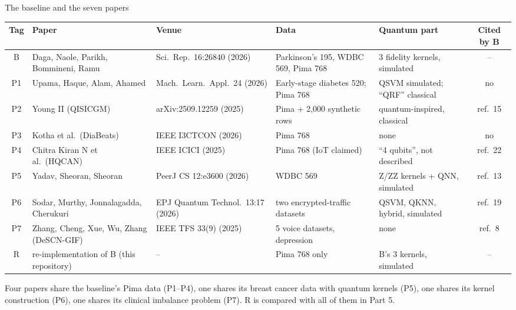 \documentclass[aspectratio=169,10pt,t,xcolor={table}]{beamer}
\begin{document}
\begin{frame}{The baseline and the seven papers}
\centering\scriptsize
\begin{tabularx}{\textwidth}{c L{3.7cm} L{3.0cm} Y L{2.7cm} c}
\toprule
Tag & Paper & Venue & Data & Quantum part & Cited by B \\
\midrule
B & Daga, Naole, Parikh, Bommineni, Ramu & Sci.\ Rep.\ 16:26840 (2026) & Parkinson's 195, WDBC 569, Pima 768 & 3 fidelity kernels, simulated & -- \\
P1 & Upama, Haque, Alam, Ahamed & Mach.\ Learn.\ Appl.\ 24 (2026) & Early-stage diabetes 520; Pima 768 & QSVM simulated; ``QRF'' classical & no \\
P2 & Young II (QISICGM) & arXiv:2509.12259 (2025) & Pima + 2,000 synthetic rows & quantum-inspired, classical & ref.\ 15 \\
P3 & Kotha et al.\ (DiaBeats) & IEEE I3CTCON (2026) & Pima 768 & none & no \\
P4 & Chitra Kiran N et al.\ (HQCAN) & IEEE ICICI (2025) & Pima 768 (IoT claimed) & ``4 qubits'', not described & ref.\ 22 \\
P5 & Yadav, Sheoran, Sheoran & PeerJ CS 12:e3600 (2026) & WDBC 569 & Z/ZZ kernels + QNN, simulated & ref.\ 13 \\
P6 & Sodar, Murthy, Jonnalagadda, Cherukuri & EPJ Quantum Technol.\ 13:17 (2026) & two encrypted-traffic datasets & QSVM, QKNN, hybrid, simulated & ref.\ 19 \\
P7 & Zhang, Cheng, Xue, Wu, Zhang (DeSCN-GIF) & IEEE TFS 33(9) (2025) & 5 voice datasets, depression & none & ref.\ 8 \\
\midrule
R & re-implementation of B (this repository) & -- & Pima 768 only & B's 3 kernels, simulated & -- \\
\bottomrule
\end{tabularx}
\par\smallskip\raggedright\scriptsize
Four papers share the baseline's Pima data (P1--P4), one shares its breast cancer data with quantum kernels (P5), one shares its kernel construction (P6), one shares its clinical imbalance problem (P7). R is compared with all of them in Part 5.
\end{frame}
\end{document}
